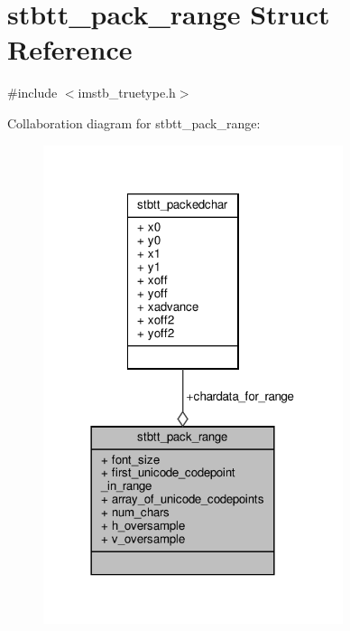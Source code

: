 \hypertarget{structstbtt__pack__range}{}\section{stbtt\+\_\+pack\+\_\+range Struct Reference}
\label{structstbtt__pack__range}


{\ttfamily \#include $<$imstb\+\_\+truetype.\+h$>$}



Collaboration diagram for stbtt\+\_\+pack\+\_\+range\+:
\nopagebreak
\begin{figure}[H]
\begin{center}
\leavevmode
\includegraphics[width=249pt]{structstbtt__pack__range__coll__graph}
\end{center}
\end{figure}
